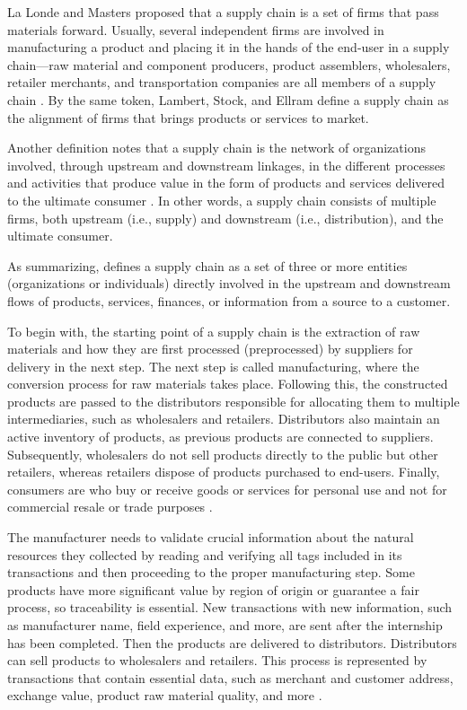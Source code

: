 La Londe and Masters proposed that a supply chain is a set of firms that pass materials forward. Usually, several independent firms are involved in manufacturing a product and placing it in the hands of the end-user in a supply chain—raw material and component producers, product assemblers, wholesalers, retailer merchants, and transportation companies are all members of a supply chain \cite{la1994emerging}. By the same token, Lambert, Stock, and Ellram define a supply chain as the alignment of firms that brings products or services to market. 

Another definition notes that a supply chain is the network of organizations involved, through upstream and downstream linkages, in the different processes and activities that produce value in the form of products and services delivered to the ultimate consumer \cite{christopher2017logistics}. In other words, a supply chain consists of multiple firms, both upstream (i.e., supply) and downstream
(i.e., distribution), and the ultimate consumer. 

As summarizing, \cite{mentzer2001defining} defines a supply chain as a set of three or more entities (organizations or individuals) directly involved in the upstream and downstream flows of products, services, finances, or information from a source to a customer. 


To begin with, the starting point of a supply chain is the extraction of raw materials and how they are first processed (preprocessed) by suppliers for delivery in the next step. The next step is called manufacturing, where the conversion process for raw materials takes place. Following this, the constructed products are passed to the distributors responsible for allocating them to multiple intermediaries, such as wholesalers and retailers. Distributors also maintain an active inventory of products, as previous products are connected to suppliers. Subsequently, wholesalers do not sell products directly to the public but other retailers, whereas retailers dispose of products purchased to end-users. Finally, consumers are who buy or receive goods or services for personal use and not for commercial resale or trade purposes \cite{litke2019blockchains}.

The manufacturer needs to validate crucial information about the natural resources they collected by reading and verifying all tags included in its transactions and then proceeding to the proper manufacturing step. Some products have more significant value by region of origin or guarantee a fair process, so traceability is essential. New transactions with new information, such as manufacturer name, field experience, and more, are sent after the internship has been completed. Then the products are delivered to distributors. Distributors can sell products to wholesalers and retailers. This process is represented by transactions that contain essential data, such as merchant and customer address, exchange value, product raw material quality, and more \cite{sauer2018extending}. 

